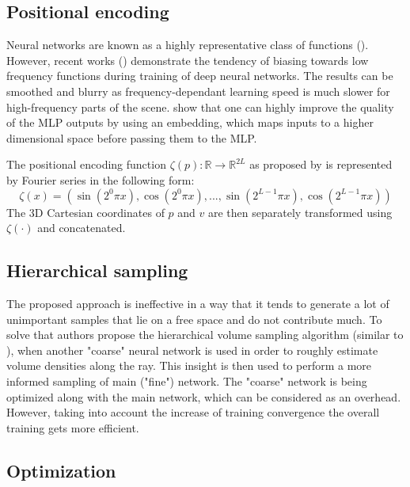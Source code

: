 \subsection{Positional encoding}
\label{subsec:pos_enc}

Neural networks are known as a highly representative class of functions (\cite{hornik1989multilayer}).
However, recent works (\cite{rahaman2019spectral, tancik2020fourfeat}) demonstrate the tendency of
biasing towards low frequency functions during training of deep neural networks.
The results can be smoothed and blurry as frequency-dependant learning speed
is much slower for high-frequency parts of the scene.
\cite{rahaman2019spectral} show that one can highly improve the quality of the MLP outputs
by using an embedding, which maps inputs to a higher dimensional space before passing them to the MLP.

The positional encoding function $\zeta(p) : \mathbb{R} \xrightarrow{} \mathbb{R}^{2L}$ as proposed by \cite{mildenhall2020nerf, vaswani2017attention} is represented by Fourier series in the following form:
\begin{equation}
    \label{eq:positional_encoding}
    \zeta(x) = (\sin(2^0\pi x), \cos(2^0\pi x), ..., \sin(2^{L-1}\pi x), \cos(2^{L-1}\pi x))
\end{equation}
The 3D Cartesian coordinates of $p$ and $v$ are then separately transformed using $\zeta(\cdot)$ and concatenated.


\subsection{Hierarchical sampling}
\label{subsec:hierarchy_sampling}

The proposed approach is ineffective in a way that it tends to generate a lot of unimportant samples
that lie on a free space and do not contribute much.
To solve that authors propose the hierarchical volume sampling algorithm (similar to \cite{levoy1990efficient}),
when another "coarse" neural network is used in order to roughly estimate volume densities along the ray.
This insight is then used to perform a more informed sampling of main ("fine") network.
The "coarse" network is being optimized along with the main network, which can be considered as an overhead.
However, taking into account the increase of training convergence the overall training gets more efficient.


\subsection{Optimization}

